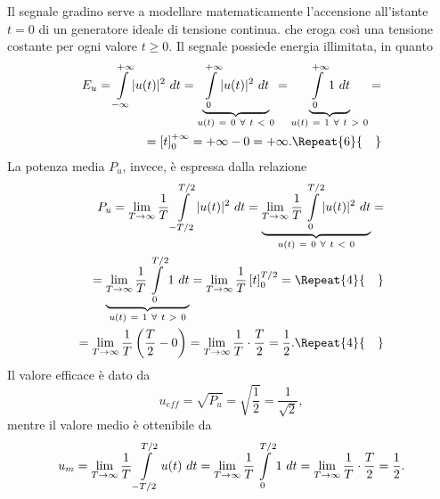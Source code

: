 \documentclass[12pt,oneside,openany]{memoir}
\numberwithin{equation}{subsection}
\DeclarePairedDelimiter{\abs}{\lvert}{\rvert}
\newcommand{\quads}[1]{\Repeat{#1}{\quad}}
\newcommand{\dt}{\ dt}
\begin{document}
\bigbreak
Il segnale gradino serve a modellare matematicamente l'accensione all'istante $t = 0$ di un generatore ideale di tensione continua. che eroga cos\`i una tensione costante per ogni valore $t \geq 0$. Il  segnale possiede energia illimitata, in quanto
\begin{equation}
	\begin{split}
		E_u = \int\displaylimits_{-\infty}^{+\infty} \abs{u(t)}^2 \dt = \underbrace{\int\displaylimits_{0}^{+\infty} \abs{u(t)}^2 \dt}_{u(t) \ = \ 0 \ \forall \ t \ < \ 0} = \underbrace{\int\displaylimits_{0}^{+\infty} 1 \dt}_{u(t) \ = \ 1 \ \forall \ t \ > \ 0} =
		\\
		= \left[ t \right]_0^{+\infty} = +\infty - 0 = +\infty.
		\quads{6}
	\end{split}
\end{equation}
La potenza media $P_u$, invece, \`e espressa dalla relazione
\begin{equation}
	\begin{split}
		P_u = \lim_{T \rightarrow \infty} \frac{1}{T} \int\displaylimits_{-T/2}^{T/2} \abs{u(t)}^2 \dt = \underbrace{\lim_{T \rightarrow \infty} \frac{1}{T} \int\displaylimits_{0}^{T/2} \abs{u(t)}^2 \dt}_{u(t) \ = \ 0 \ \forall \ t \ < \ 0} =
		\\
		= \underbrace{\lim_{T \rightarrow \infty} \frac{1}{T} \int\displaylimits_{0}^{T/2} 1 \dt}_{u(t) \ = \ 1 \ \forall \ t \ > \ 0} = \lim_{T \rightarrow \infty} \frac{1}{T} \left[ t \right]_0^{T/2} =
		\quads{4}
		\\
		= \lim_{T \rightarrow \infty} \frac{1}{T} \left(\frac{T}{2} - 0\right) = \lim_{T \rightarrow \infty} \frac{1}{T} \cdot \frac{T}{2} = \frac{1}{2}.
		\quads{4}
	\end{split}
\end{equation}
Il valore efficace \`e dato da
\begin{equation}
	u_{eff} = \sqrt{P_u} = \sqrt{\frac{1}{2}} = \frac{1}{\sqrt{2}},
\end{equation}
mentre il valore medio \`e ottenibile da
\begin{equation}
	\begin{split}
		u_m = \lim_{T \rightarrow \infty} \frac{1}{T} \int\displaylimits_{-T/2}^{T/2} u(t) \dt = \lim_{T \rightarrow \infty} \frac{1}{T} \int\displaylimits_{0}^{T/2} 1 \dt = \lim_{T \rightarrow \infty} \frac{1}{T} \cdot \frac{T}{2} = \frac{1}{2}.
	\end{split}
\end{equation}
\end{document}
